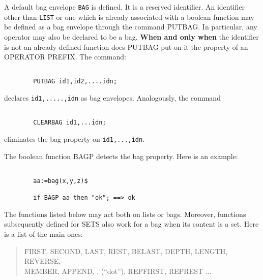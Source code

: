 \item[i.] A default bag envelope \verb+BAG+ is defined.
It is a reserved identifier.
An identifier other than \verb+LIST+ or one which is already associated
with a boolean function may be defined as a bag envelope through the
command \f{PUTBAG}. In particular, any operator may also be declared
to be a bag. {\bf When and only when} the identifier is not an already defined
function does \f{PUTBAG} put on it the property of an OPERATOR PREFIX.
The command:
\begin{verbatim}

        PUTBAG id1,id2,....idn;

\end{verbatim}
declares \verb+id1,.....,idn+ as bag envelopes.
Analogously, the command
\begin{verbatim}

        CLEARBAG id1,...idn;

\end{verbatim}
eliminates the bag property on \verb+id1,...,idn+.
\item[ii.] The boolean function \f{BAGP} detects the bag property.
Here is an example:
\begin{verbatim}

        aa:=bag(x,y,z)$

        if BAGP aa then "ok"; ==> ok

\end{verbatim}
\item[iii.] The functions listed below may act both on lists or bags.
Moreover, functions subsequently  defined for  SETS also work for a bag
when its content is a set.
Here is a list of the main ones:

\begin{quotation}
\noindent
\f{FIRST, SECOND, LAST, REST, BELAST, DEPTH, LENGTH, REVERSE,\\
MEMBER, APPEND, . (``dot''), REPFIRST, REPREST} $\ldots$
\end{quotation}

